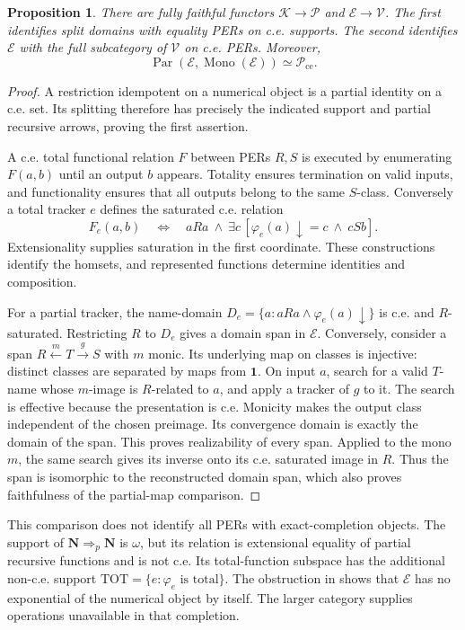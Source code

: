 \documentclass[11pt]{article}
\newtheorem{proposition}[theorem]{Proposition}
\theoremstyle{definition}
\newcommand{\N}{\omega}
\newcommand{\Pcat}{\mathcal P}
\newcommand{\Vcat}{\mathcal V}
\newcommand{\pArr}{\mathbin{\Rightarrow_{\!p}}}
\newcommand{\Par}{\operatorname{Par}}
\begin{document}
\begin{proposition}\label{prop:completion}
There are fully faithful functors
$\mathcal K\to\Pcat$ and $\mathcal E\to\Vcat$.
The first identifies split domains with equality PERs on c.e. supports.
The second identifies $\mathcal E$ with the full subcategory of
$\Vcat$ on c.e. PERs. Moreover,
\[
 \Par(\mathcal E,\operatorname{Mono}(\mathcal E))
       \simeq\Pcat_{\mathrm{ce}}.
\]
\end{proposition}
\begin{proof}
A restriction idempotent on a numerical object is a partial identity
on a c.e. set. Its splitting therefore has precisely the indicated
support and partial recursive arrows, proving the first assertion.

A c.e. total functional relation $F$ between PERs $R,S$ is executed
by enumerating $F(a,b)$ until an output $b$ appears. Totality ensures
termination on valid inputs, and functionality ensures that all
outputs belong to the same $S$-class. Conversely a total tracker $e$
defines the saturated c.e. relation
\[
 F_e(a,b)\quad\Longleftrightarrow\quad
 aRa\ \land\ \exists c\,[\varphi_e(a)\downarrow=c\ \land\ cSb].
\]
Extensionality supplies saturation in the first coordinate. These
constructions identify the homsets, and represented functions determine
identities and composition.

For a partial tracker, the name-domain
$D_e=\{a:aRa\land\varphi_e(a)\downarrow\}$ is c.e. and
$R$-saturated. Restricting $R$ to $D_e$ gives a domain span in
$\mathcal E$. Conversely, consider a span
$R\xleftarrow{m}T\xrightarrow{g}S$ with $m$ monic. Its underlying
map on classes is injective: distinct classes are separated by maps
from $\mathbf1$. On input $a$, search for a valid $T$-name whose
$m$-image is $R$-related to $a$, and apply a tracker of $g$ to it.
The search is effective because the presentation is c.e. Monicity
makes the output class independent of the chosen preimage. Its
convergence domain is exactly the domain of the span. This proves
realizability of every span. Applied to the mono $m$, the same
search gives its inverse onto its c.e. saturated image in $R$.
Thus the span is isomorphic to the reconstructed domain span,
which also proves faithfulness of the partial-map comparison.
\end{proof}

This comparison does not identify all PERs with exact-completion
objects. The support of $\mathbf N\pArr\mathbf N$ is $\N$,
but its relation is extensional equality of partial recursive
functions and is not c.e. Its total-function subspace has the
additional non-c.e. support
$\mathrm{TOT}=\{e:\varphi_e\text{ is total}\}$.
The obstruction in \cite[section ``Total function spaces and finite
observations'']{External} shows that $\mathcal E$ has no exponential
of the numerical object by itself. The larger category supplies
operations unavailable in that completion.
\end{document}
